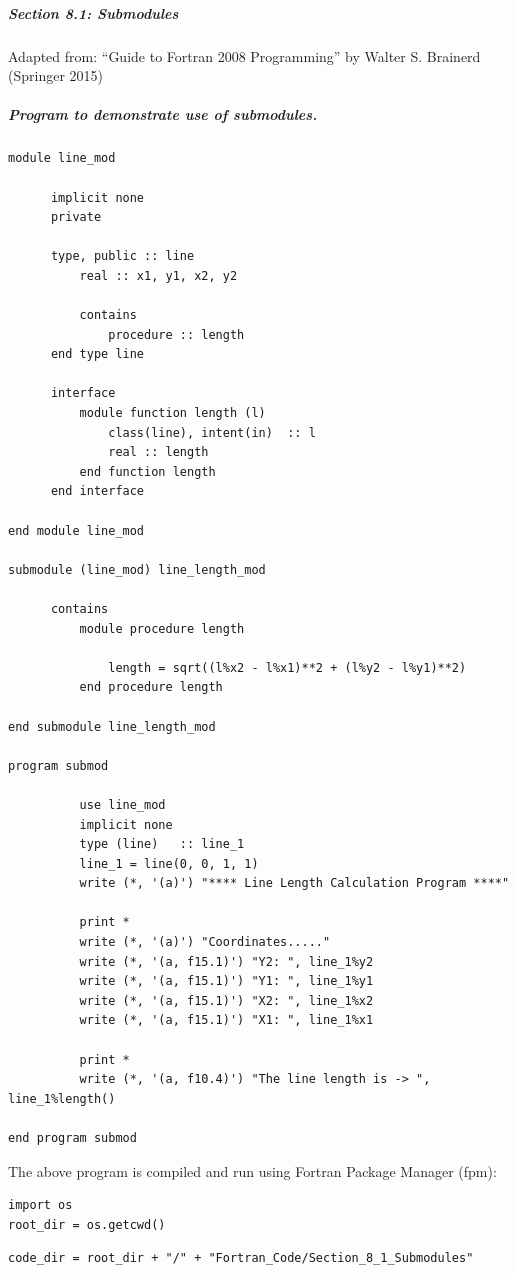 \subparagraph{Section 8.1: Submodules}

Adapted from: ``Guide to Fortran 2008 Programming'' by Walter S. Brainerd (Springer 2015)

\subparagraph{Program to demonstrate use of submodules.}

\begin{verbatim}
module line_mod

      implicit none
      private

      type, public :: line
          real :: x1, y1, x2, y2

          contains
              procedure :: length
      end type line

      interface
          module function length (l)
              class(line), intent(in)  :: l
              real :: length
          end function length
      end interface

end module line_mod

submodule (line_mod) line_length_mod

      contains
          module procedure length

              length = sqrt((l%x2 - l%x1)**2 + (l%y2 - l%y1)**2)
          end procedure length

end submodule line_length_mod

program submod

          use line_mod
          implicit none
          type (line)   :: line_1
          line_1 = line(0, 0, 1, 1)
          write (*, '(a)') "**** Line Length Calculation Program ****"

          print *
          write (*, '(a)') "Coordinates....."
          write (*, '(a, f15.1)') "Y2: ", line_1%y2
          write (*, '(a, f15.1)') "Y1: ", line_1%y1
          write (*, '(a, f15.1)') "X2: ", line_1%x2
          write (*, '(a, f15.1)') "X1: ", line_1%x1

          print *
          write (*, '(a, f10.4)') "The line length is -> ", line_1%length()

end program submod
\end{verbatim}

The above program is compiled and run using Fortran Package Manager (fpm):

\begin{verbatim}
import os
root_dir = os.getcwd()
\end{verbatim}

\begin{verbatim}
code_dir = root_dir + "/" + "Fortran_Code/Section_8_1_Submodules"
\end{verbatim}

